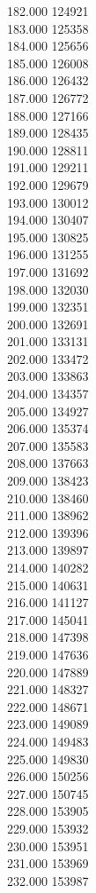 { 182.000	124921 \\
 183.000	125358 \\
 184.000	125656 \\
 185.000	126008 \\
 186.000	126432 \\
 187.000	126772 \\
 188.000	127166 \\
 189.000	128435 \\
 190.000	128811 \\
 191.000	129211 \\
 192.000	129679 \\
 193.000	130012 \\
 194.000	130407 \\
 195.000	130825 \\
 196.000	131255 \\
 197.000	131692 \\
 198.000	132030 \\
 199.000	132351 \\
 200.000	132691 \\
 201.000	133131 \\
 202.000	133472 \\
 203.000	133863 \\
 204.000	134357 \\
 205.000	134927 \\
 206.000	135374 \\
 207.000	135583 \\
 208.000	137663 \\
 209.000	138423 \\
 210.000	138460 \\
 211.000	138962 \\
 212.000	139396 \\
 213.000	139897 \\
 214.000	140282 \\
 215.000	140631 \\
 216.000	141127 \\
 217.000	145041 \\
 218.000	147398 \\
 219.000	147636 \\
 220.000	147889 \\
 221.000	148327 \\
 222.000	148671 \\
 223.000	149089 \\
 224.000	149483 \\
 225.000	149830 \\
 226.000	150256 \\
 227.000	150745 \\
 228.000	153905 \\
 229.000	153932 \\
 230.000	153951 \\
 231.000	153969 \\
 232.000	153987 \\
}
